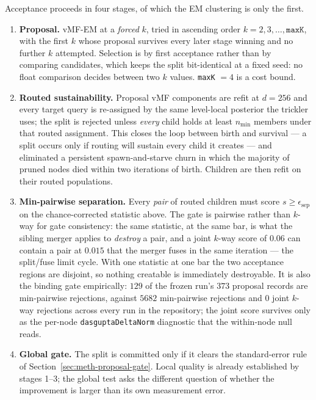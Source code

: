 Acceptance proceeds in four stages, of which the EM clustering is only the first.
\begin{enumerate}
\item \textbf{Proposal.} vMF-EM at a \emph{forced} $k$, tried in ascending order
$k = 2, 3, \ldots, \texttt{maxK}$, with the first $k$ whose proposal survives every later
stage winning and no further $k$ attempted. Selection is by first acceptance rather than
by comparing candidates, which keeps the split bit-identical at a fixed seed: no float
comparison decides between two $k$ values. \texttt{maxK} $= 4$ is a cost bound.
\item \textbf{Routed sustainability.} Proposal vMF components are refit at $d = 256$ and
every target query is re-assigned by the same level-local posterior the trickler uses;
the split is rejected unless \emph{every} child holds at least $n_{\min}$ members under
that routed assignment.
This closes the loop between birth and survival --- a split occurs only if routing will
sustain every child it creates --- and eliminated a persistent spawn-and-starve churn in
which the majority of pruned nodes died within two iterations of birth. Children are then
refit on their routed populations.
\item \textbf{Min-pairwise separation.} Every \emph{pair} of routed children must score
$s \geq \epsilon_{\text{sep}}$ on the chance-corrected statistic above.
The gate is pairwise rather than $k$-way for gate consistency: the same statistic, at
the same bar, is what the sibling merger applies to \emph{destroy} a pair, and a joint
$k$-way score of $0.06$ can contain a pair at $0.015$ that the merger fuses in the same
iteration --- the split/fuse limit cycle. With one statistic at one bar the two
acceptance regions are disjoint, so nothing creatable is immediately destroyable.
It is also the binding gate empirically: $129$ of the frozen run's $373$ proposal records
are min-pairwise rejections, against $5682$ min-pairwise rejections and $0$ joint $k$-way
rejections across every run in the repository; the joint score survives only as the
per-node \texttt{dasguptaDeltaNorm} diagnostic that the within-node null reads.
\item \textbf{Global gate.} The split is committed only if it clears the standard-error
rule of Section~\ref{sec:meth-proposal-gate}. Local quality is already established by
stages 1--3; the global test asks the different question of whether the improvement is
larger than its own measurement error.
\end{enumerate}
